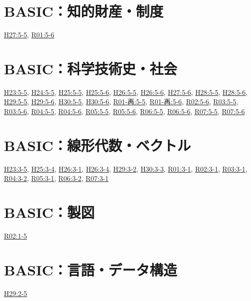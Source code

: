 \section{BASIC：知的財産・制度}
\hyperref[q:h27-reg-basic-5-5]{H27:5-5}, \hyperref[q:r01-reg-basic-5-6]{R01:5-6}
\section{BASIC：科学技術史・社会}
\hyperref[q:h23-reg-basic-5-5]{H23:5-5}, \hyperref[q:h24-reg-basic-5-5]{H24:5-5}, \hyperref[q:h25-reg-basic-5-5]{H25:5-5}, \hyperref[q:h25-reg-basic-5-6]{H25:5-6}, \hyperref[q:h26-reg-basic-5-5]{H26:5-5}, \hyperref[q:h26-reg-basic-5-6]{H26:5-6}, \hyperref[q:h27-reg-basic-5-6]{H27:5-6}, \hyperref[q:h28-reg-basic-5-5]{H28:5-5}, \hyperref[q:h28-reg-basic-5-6]{H28:5-6}, \hyperref[q:h29-reg-basic-5-5]{H29:5-5}, \hyperref[q:h29-reg-basic-5-6]{H29:5-6}, \hyperref[q:h30-reg-basic-5-5]{H30:5-5}, \hyperref[q:h30-reg-basic-5-6]{H30:5-6}, \hyperref[q:r01-ret-basic-5-5]{R01-再:5-5}, \hyperref[q:r01-ret-basic-5-6]{R01-再:5-6}, \hyperref[q:r02-reg-basic-5-6]{R02:5-6}, \hyperref[q:r03-reg-basic-5-5]{R03:5-5}, \hyperref[q:r03-reg-basic-5-6]{R03:5-6}, \hyperref[q:r04-reg-basic-5-5]{R04:5-5}, \hyperref[q:r04-reg-basic-5-6]{R04:5-6}, \hyperref[q:r05-reg-basic-5-5]{R05:5-5}, \hyperref[q:r05-reg-basic-5-6]{R05:5-6}, \hyperref[q:r06-reg-basic-5-5]{R06:5-5}, \hyperref[q:r06-reg-basic-5-6]{R06:5-6}, \hyperref[q:r07-reg-basic-5-5]{R07:5-5}, \hyperref[q:r07-reg-basic-5-6]{R07:5-6}
\section{BASIC：線形代数・ベクトル}
\hyperref[q:h23-reg-basic-3-5]{H23:3-5}, \hyperref[q:h25-reg-basic-3-4]{H25:3-4}, \hyperref[q:h26-reg-basic-3-1]{H26:3-1}, \hyperref[q:h26-reg-basic-3-4]{H26:3-4}, \hyperref[q:h29-reg-basic-3-2]{H29:3-2}, \hyperref[q:h30-reg-basic-3-3]{H30:3-3}, \hyperref[q:r01-reg-basic-3-1]{R01:3-1}, \hyperref[q:r02-reg-basic-3-1]{R02:3-1}, \hyperref[q:r03-reg-basic-3-1]{R03:3-1}, \hyperref[q:r04-reg-basic-3-2]{R04:3-2}, \hyperref[q:r05-reg-basic-3-1]{R05:3-1}, \hyperref[q:r06-reg-basic-3-2]{R06:3-2}, \hyperref[q:r07-reg-basic-3-1]{R07:3-1}
\section{BASIC：製図}
\hyperref[q:r02-reg-basic-1-5]{R02:1-5}
\section{BASIC：言語・データ構造}
\hyperref[q:h29-reg-basic-2-5]{H29:2-5}
